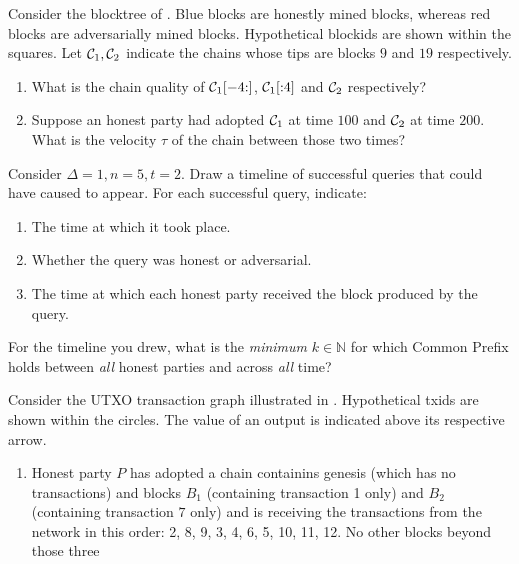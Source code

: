 \begin{problems}
  \item Consider the blocktree of . Blue blocks are honestly
        mined blocks, whereas red blocks are adversarially mined blocks.
        Hypothetical blockids are shown within the squares. Let
        $\mathcal{C}_1, \mathcal{C}_2$ indicate the chains whose tips are blocks $9$ and
        $19$ respectively.
        \begin{enumerate}
          \item What is the chain quality of $\mathcal{C}_1[-4{:}]$, $\mathcal{C}_1[{:}4]$
                and $\mathcal{C}_2$ respectively?
          \item Suppose an honest party had adopted $\mathcal{C}_1$ at time $100$ and
                $\mathcal{C}_2$ at time $200$. What is the velocity $\tau$ of the
                chain between those two times?
        \end{enumerate}
  \item Consider $\Delta = 1, n = 5, t = 2$. Draw a timeline of successful
        queries that could have caused  to appear.
        For each successful query, indicate:
        \begin{enumerate}
          \item The time at which it took place.
          \item Whether the query was honest or adversarial.
          \item The time at which each honest party received the block produced
                by the query.
        \end{enumerate}
        For the timeline you drew, what is the \emph{minimum} $k \in \mathbb{N}$
        for which Common Prefix holds between \emph{all} honest parties and
        across \emph{all} time?
  \item Consider the UTXO transaction graph illustrated in .
        Hypothetical txids are shown within the circles. The value of an output
        is indicated above its respective arrow. \label{problem.tx-graph}
        \begin{enumerate}
          \item Honest party $P$ has adopted a chain containins genesis (which
                has no transactions) and blocks $B_1$ (containing transaction 1
                only) and $B_2$ (containing transaction $7$ only) and is
                receiving the transactions from the network in this order: 2, 8,
                9, 3, 4, 6, 5, 10, 11, 12. No other blocks beyond those three

\end{enumerate}
\end{problems}
